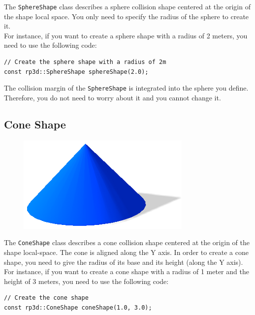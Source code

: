 \documentclass[a4paper,12pt]{article}
\begin{document}
    The \texttt{SphereShape} class describes a sphere collision shape centered at the origin of the shape local space. You only need to specify the radius of the sphere to create it. \\

    For instance, if you want to create a sphere shape with a radius of 2 meters, you need to use the following code: \\

    \begin{lstlisting}
// Create the sphere shape with a radius of 2m
const rp3d::SphereShape sphereShape(2.0);
  \end{lstlisting}

    \vspace{0.6cm}

    The collision margin of the \texttt{SphereShape} is integrated into the sphere you define. Therefore, you do not need to worry about it and you cannot change it.

    \subsection{Cone Shape}

    \begin{figure}[h]
        \centering
        \includegraphics{coneshape.png}
        \label{fig:coneshape}
    \end{figure}

    The \texttt{ConeShape} class describes a cone collision shape centered at the origin of the shape local-space. The cone is aligned along the Y axis.
    In order to create a cone shape, you need to give the radius of its base and its height (along the Y axis). \\

    For instance, if you want to create a cone shape with a radius of 1 meter and the height of 3 meters, you need to use the following code: \\

    \begin{lstlisting}
// Create the cone shape
const rp3d::ConeShape coneShape(1.0, 3.0);
  \end{lstlisting}
\end{document}
